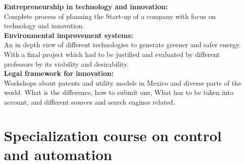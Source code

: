 \documentclass{article}
\begin{document}
\textbf{Entrepreneurship in technology and innovation:}\\
    Complete process of planning the Start-up of a company with focus on technology and innovation.\\

\textbf{Environmental improvement systems:}\\
    An in depth view of different technologies to generate greener and safer energy.
    With a final project which had to be justified and evaluated by different professors by
    its viability and desirability.\\


\textbf{Legal framework for innovation:}\\
    Workshops about patents and  utility models in Mexico and diverse parts of the world.
    What is the difference, how to submit one,
    What has to be taken into account, and
    different sources and search engines related.\\


\section{Specialization course on control and automation}
\end{document}
